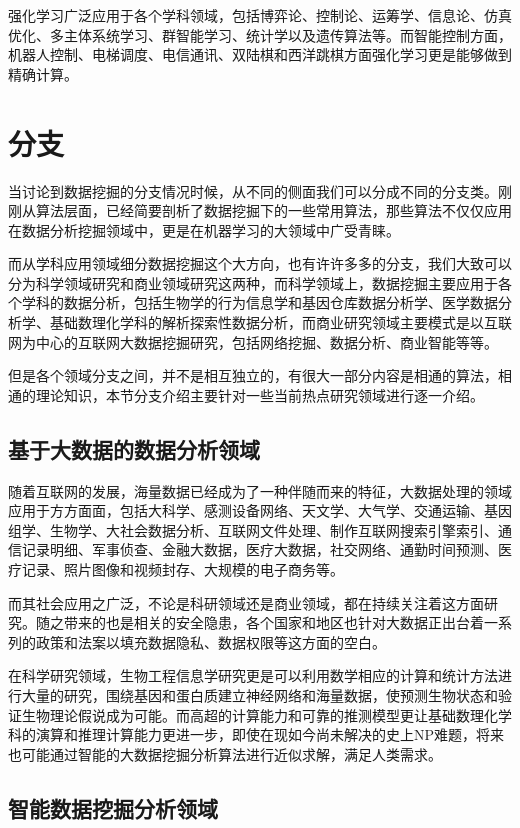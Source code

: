 \documentclass{elegantpaper}
\begin{document}
强化学习广泛应用于各个学科领域，包括博弈论、控制论、运筹学、信息论、仿真优化、多主体系统学习、群智能学习、统计学以及遗传算法等。而智能控制方面，机器人控制、电梯调度、电信通讯、双陆棋和西洋跳棋方面强化学习更是能够做到精确计算。


\section{分支}

当讨论到数据挖掘的分支情况时候，从不同的侧面我们可以分成不同的分支类。刚刚从算法层面，已经简要剖析了数据挖掘下的一些常用算法，那些算法不仅仅应用在数据分析挖掘领域中，更是在机器学习的大领域中广受青睐。

而从学科应用领域细分数据挖掘这个大方向，也有许许多多的分支，我们大致可以分为科学领域研究和商业领域研究这两种，而科学领域上，数据挖掘主要应用于各个学科的数据分析，包括生物学的行为信息学和基因仓库数据分析学、医学数据分析学、基础数理化学科的解析探索性数据分析，而商业研究领域主要模式是以互联网为中心的互联网大数据挖掘研究，包括网络挖掘、数据分析、商业智能等等。

但是各个领域分支之间，并不是相互独立的，有很大一部分内容是相通的算法，相通的理论知识，本节分支介绍主要针对一些当前热点研究领域进行逐一介绍。

\subsection{基于大数据的数据分析领域}

随着互联网的发展，海量数据已经成为了一种伴随而来的特征，大数据处理的领域应用于方方面面，包括大科学、感测设备网络、天文学、大气学、交通运输、基因组学、生物学、大社会数据分析、互联网文件处理、制作互联网搜索引擎索引、通信记录明细、军事侦查、金融大数据，医疗大数据，社交网络、通勤时间预测、医疗记录、照片图像和视频封存、大规模的电子商务等。

而其社会应用之广泛，不论是科研领域还是商业领域，都在持续关注着这方面研究。随之带来的也是相关的安全隐患，各个国家和地区也针对大数据正出台着一系列的政策和法案以填充数据隐私、数据权限等这方面的空白。

在科学研究领域，生物工程信息学研究更是可以利用数学相应的计算和统计方法进行大量的研究，围绕基因和蛋白质建立神经网络和海量数据，使预测生物状态和验证生物理论假说成为可能。而高超的计算能力和可靠的推测模型更让基础数理化学科的演算和推理计算能力更进一步，即使在现如今尚未解决的史上NP难题，将来也可能通过智能的大数据挖掘分析算法进行近似求解，满足人类需求。

\subsection{智能数据挖掘分析领域}
\end{document}
